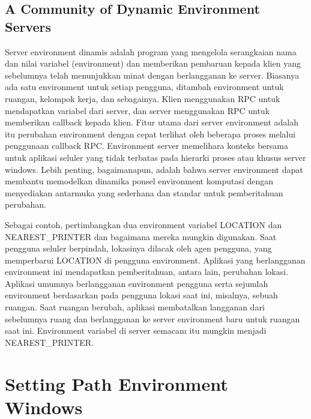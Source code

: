 \subsection {A Community of Dynamic Environment Servers}

Server environment dinamis adalah program yang mengelola serangkaian nama dan nilai variabel (environment) dan memberikan pembaruan kepada klien yang sebelumnya telah menunjukkan minat dengan berlangganan ke server. Biasanya ada satu environment untuk setiap pengguna, ditambah environment untuk ruangan, kelompok kerja, dan sebagainya. Klien menggunakan RPC untuk mendapatkan variabel dari server, dan server menggunakan RPC untuk memberikan callback kepada klien. Fitur utama dari server environment adalah itu perubahan environment dengan cepat terlihat oleh beberapa proses melalui penggunaan callback RPC. Environment server memelihara konteks bersama untuk aplikasi seluler yang tidak terbatas pada hierarki proses atau khusus server windows. Lebih penting, bagaimanapun, adalah bahwa server environment dapat membantu memodelkan dinamika ponsel environment komputasi dengan menyediakan antarmuka yang sederhana dan standar untuk pemberitahuan perubahan.

Sebagai contoh, pertimbangkan dua environment variabel LOCATION dan NEAREST_PRINTER dan bagaimana mereka mungkin digunakan. Saat pengguna seluler berpindah, lokasinya dilacak oleh agen pengguna, yang memperbarui LOCATION di pengguna environment. Aplikasi yang berlangganan environment ini mendapatkan pemberitahuan, antara lain, perubahan lokasi.
Aplikasi umumnya berlangganan environment pengguna serta sejumlah environment berdasarkan pada pengguna lokasi saat ini, misalnya, sebuah ruangan. Saat ruangan berubah, aplikasi membatalkan langganan dari sebelumnya ruang dan berlangganan ke server environment baru untuk ruangan saat ini. Environment variabel di server semacam itu mungkin menjadi NEAREST_PRINTER.
\cite{schilit1993customizing}


\section {Setting Path Environment Windows}

